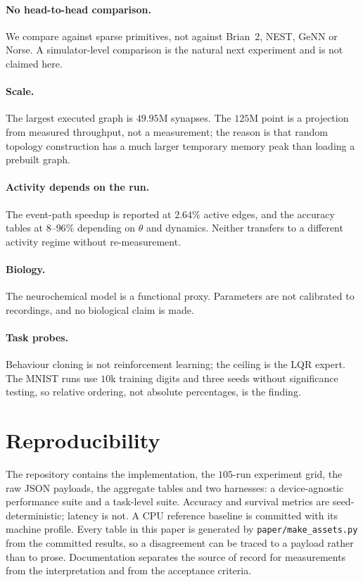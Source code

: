 \documentclass[11pt]{article}
\begin{document}
\paragraph{No head-to-head comparison.} We compare against sparse primitives,
not against Brian~2, NEST, GeNN or Norse. A simulator-level comparison is the
natural next experiment and is not claimed here.

\paragraph{Scale.} The largest executed graph is $49.95$M synapses. The $125$M
point is a projection from measured throughput, not a measurement; the reason is
that random topology construction has a much larger temporary memory peak than
loading a prebuilt graph.

\paragraph{Activity depends on the run.} The event-path speedup is reported at
$2.64\%$ active edges, and the accuracy tables at $8$--$96\%$ depending on
$\theta$ and dynamics. Neither transfers to a different activity regime without
re-measurement.

\paragraph{Biology.} The neurochemical model is a functional proxy. Parameters
are not calibrated to recordings, and no biological claim is made.

\paragraph{Task probes.} Behaviour cloning is not reinforcement learning; the
ceiling is the LQR expert. The MNIST runs use $10$k training digits and three
seeds without significance testing, so relative ordering, not absolute
percentages, is the finding.

\section{Reproducibility}

The repository contains the implementation, the $105$-run experiment grid, the
raw JSON payloads, the aggregate tables and two harnesses: a device-agnostic
performance suite and a task-level suite. Accuracy and survival metrics are
seed-deterministic; latency is not. A CPU reference baseline is committed with
its machine profile. Every table in this paper is generated by
\texttt{paper/make\_assets.py} from the committed results, so a disagreement can
be traced to a payload rather than to prose. Documentation separates the source
of record for measurements from the interpretation and from the acceptance
criteria.
\end{document}
